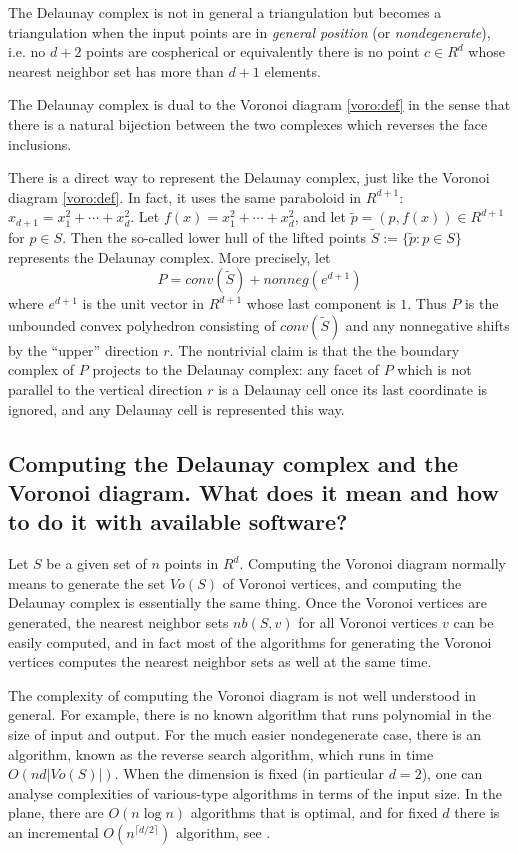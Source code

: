 \documentclass[[a4paper,12pt]{article}
\begin{document}
The Delaunay complex is not in general a triangulation
but becomes a triangulation when the input points are in
{\em general position} (or {\em nondegenerate}),
i.e. no $d+2$ points are cospherical or equivalently there is no
point $c\in R^d$ whose nearest neighbor set has more than $d+1$ elements.

The Delaunay complex is dual to the Voronoi diagram \ref{voro:def}
in the sense that there is a natural bijection between the
two complexes which reverses the face inclusions.

There is a direct way to represent the Delaunay complex, just like
the Voronoi diagram \ref{voro:def}.  In fact, it uses the same 
paraboloid in $R^{d+1}$:  $x_{d+1} = x_1^2 + \cdots + x_d^2$.
Let $f(x) = x_1^2 + \cdots + x_d^2$, and let $\tilde{p}= (p, f(x)) \in R^{d+1}$
for $p \in S$.    Then the so-called lower hull of the lifted points
 $\tilde{S}:=\{\tilde{p}:  p\in S\}$ represents the Delaunay complex.
More precisely, let  
\[
P =  conv(\tilde{S}) + nonneg(e^{d+1})
\]
where $e^{d+1}$ is the unit vector in $R^{d+1}$ whose last component is $1$.
Thus $P$ is the unbounded convex polyhedron
consisting of  $conv(\tilde{S})$ and
any nonnegative shifts by the ``upper'' direction $r$.
The nontrivial claim is that the the boundary complex of $P$ projects
to the Delaunay complex:  any facet of $P$ which is not parallel
to the vertical direction $r$ is a Delaunay cell once its last coordinate
is ignored, and any Delaunay cell is represented this way.

\subsection{Computing the Delaunay complex and the Voronoi diagram.  
What does it mean and how to do it with available software?}
\label{voro:computation}

Let $S$ be a given set of $n$ points in $R^d$.
Computing the Voronoi diagram normally means to generate
the set $Vo(S)$ of Voronoi vertices, and computing the Delaunay complex
is essentially the same thing.  Once the Voronoi vertices are
generated, the nearest neighbor sets $nb(S, v)$ for all Voronoi
vertices $v$ can be easily computed, and in fact most
of the algorithms for generating the Voronoi vertices
computes the nearest neighbor sets as well at the same time.

The complexity of computing the Voronoi diagram is not well
understood in general.   For example, there is no known
algorithm that runs polynomial in the size of input and output.
For the much easier nondegenerate case, there is an algorithm,
known as the reverse search algorithm, which runs
in time $O(n d |Vo(S)|)$.   When the dimension is fixed (in particular
$d=2$), one can analyse complexities of various-type algorithms
in terms of the input size.  In the plane, there are $O(n \log n)$
algorithms that is optimal,
and for fixed $d$ there is an incremental $O(n^{\lceil d/2 \rceil})$ algorithm,
see \cite[Chapter 20]{go-hbdcg-97}.
\end{document}
